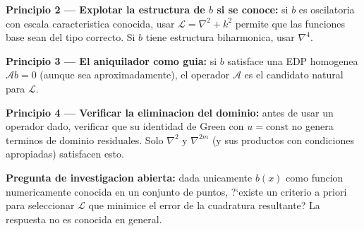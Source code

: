 \documentclass[12pt,a4paper]{article}
\begin{document}
\textbf{Principio 2 --- Explotar la estructura de $b$ si se conoce:} si $b$
es oscilatoria con escala caracteristica conocida, usar $\mathcal{L} = \nabla^2
+ k^2$ permite que las funciones base sean del tipo correcto. Si $b$ tiene
estructura biharmonica, usar $\nabla^4$.

\textbf{Principio 3 --- El aniquilador como guia:} si $b$ satisface una EDP
homogenea $\mathcal{A}b = 0$ (aunque sea aproximadamente), el operador
$\mathcal{A}$ es el candidato natural para $\mathcal{L}$.

\textbf{Principio 4 --- Verificar la eliminacion del dominio:} antes de usar
un operador dado, verificar que su identidad de Green con $u = \text{const}$
no genera terminos de dominio residuales. Solo $\nabla^2$ y $\nabla^{2m}$
(y sus productos con condiciones apropiadas) satisfacen esto.

\textbf{Pregunta de investigacion abierta:} dada unicamente $b(x)$ como
funcion numericamente conocida en un conjunto de puntos, ?`existe un criterio
a priori para seleccionar $\mathcal{L}$ que minimice el error de la cuadratura
resultante? La respuesta no es conocida en general.



\end{document}
